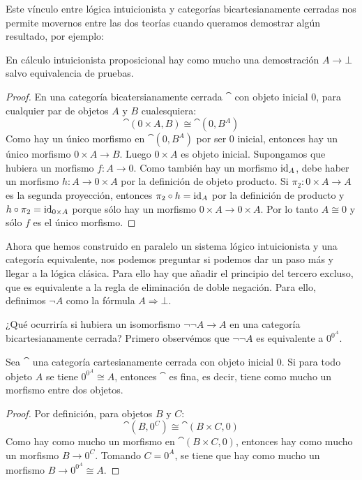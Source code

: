 Este vínculo entre lógica intuicionista y categorías bicartesianamente cerradas nos permite movernos entre las dos teorías cuando queramos demostrar algún resultado, por ejemplo:
\begin{lemma}
En cálculo intuicionista proposicional hay como mucho una demostración $A \to \bot$ salvo equivalencia de pruebas.
\end{lemma}
\begin{proof}
En una categoría bicatersianamente cerrada $\cat$ con objeto inicial $0$, para cualquier par de objetos $A$ y $B$ cualesquiera:
\[ \cat(0 \times A, B) \cong \cat(0, B^A) \]
Como hay un único morfismo en $\cat(0, B^A)$ por ser $0$ inicial, entonces hay un único morfismo $0 \times A \to B$.
Luego $0 \times A$ es objeto inicial.
Supongamos que hubiera un morfismo $f \colon A \to 0$.
Como también hay un morfismo $\id_A$, debe haber un morfismo $h \colon A \to 0 \times A$ por la definición de objeto producto.
Si $\pi_2 \colon 0 \times A \to A$ es la segunda proyección, entonces $\pi_2 \circ h = \id_A$ por la definición de producto y $h \circ \pi_2 = \id_{0 \times A}$ porque sólo hay un morfismo $0 \times A \to 0 \times A$.
Por lo tanto $A \cong 0$ y sólo $f$ es el único morfismo.
\end{proof}

Ahora que hemos construido en paralelo un sistema lógico intuicionista y una categoría equivalente, nos podemos preguntar si podemos dar un paso más y llegar a la lógica clásica.
Para ello hay que añadir el principio del tercero excluso, que es equivalente a la regla de eliminación de doble negación.
Para ello, definimos $\neg A$ como la fórmula $A \Rightarrow \bot$.
\begin{prooftree}
\end{prooftree}
¿Qué ocurriría si hubiera un isomorfismo $\neg \neg A \to A$ en una categoría bicartesianamente cerrada?
Primero observémos que $\neg \neg A$ es equivalente a $0^{0^A}$.

\begin{theorem}
Sea $\cat$ una categoría cartesianamente cerrada con objeto inicial $0$.
Si para todo objeto $A$ se tiene $0^{0^A} \cong A$, entonces $\cat$ es fina, es decir, tiene como mucho un morfismo entre dos objetos.
\end{theorem}
\begin{proof}
Por definición, para objetos $B$ y $C$:
\[ \cat(B, 0^C) \cong \cat(B \times C, 0) \]
Como hay como mucho un morfismo en $\cat(B \times C, 0)$, entonces hay como mucho un morfismo $B \to 0^C$.
Tomando $C = 0^A$, se tiene que hay como mucho un morfismo $B \to 0^{0^A} \cong A$.
\end{proof}


